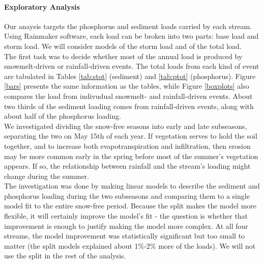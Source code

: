 \documentclass[12pt]{article}
\begin{document}
\paragraph{Exploratory Analysis}
Our anaysis targets the phosphorus and sediment loads carried by each stream. Using Rainmaker software, each load can be broken into two parts: base load and storm load. We will consider models of the storm load and of the total load.\\

The first task was to decide whether most of the annual load is produced by snowmelt-driven or rainfall-driven events. The total loads from each kind of event are tabulated in Tables \ref{tab:stot} (sediment) and \ref{tab:ptot} (phosphorus). Figure \ref{bars} presents the same information as the tables, while Figure \ref{boxplots} also compares the load from indivudual snowmelt- and rainfall-driven events. About two thirds of the sediment loading comes from rainfall-driven events, along with about half of the phosphorus loading.\\

We investigated dividing the snow-free seasons into early and late subseasons, separating the two on May 15th of each year. If vegetation serves to hold the soil together, and to increase both evapotranspiration and infiltration, then erosion may be more common early in the spring before most of the summer's vegetation appears. If so, the relationship between rainfall and the stream's loading might change during the summer.\\

The investigation was done by making linear models to describe the sediment and phosphorus loading during the two subseasons and comparing them to a single model fit to the entire snow-free period. Because the split makes the model more flexible, it will certainly improve the model's fit - the question is whether that improvement is enough to justify making the model more complex. At all four streams, the model improvement was statistically significant but too small to matter (the split models explained about 1\%-2\% more of the loads). We will not use the split in the rest of the analysis.\\
\end{document}
